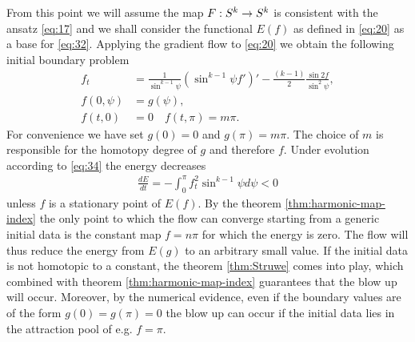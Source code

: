 From this point we will assume the map $F:S^k\rightarrow S^k$ is consistent
with the ansatz \eqref{eq:17} and we shall consider the functional
$E(f)$ as defined in \eqref{eq:20} as a base for
\eqref{eq:32}. Applying the gradient flow to \eqref{eq:20} we obtain
the following initial boundary problem
\begin{equation}
  \label{eq:en_flow}
  \begin{split}
    f_t&=\frac{1}{\sin^{k-1}\psi}\left(\sin^{k-1}\psi
      f'\right)'-\frac{(k-1)}{2}\frac{\sin2f}{\sin^2\psi},\\
    f(0,\psi)&=g(\psi),\\
    f(t,0)&=0\quad f(t,\pi)=m\pi.
  \end{split}
\end{equation}
For convenience we have set $g(0)=0$ and $g(\pi)=m\pi$. The choice of
$m$ is responsible for the homotopy degree of $g$ and therefore
$f$. Under evolution according to \eqref{eq:34} the energy decreases
\begin{align}
  \label{eq:35}
  \frac{dE}{dt}=-\int_0^{\pi}f_t^2\sin^{k-1}\psi d\psi<0
\end{align}
unless $f$ is a stationary point of $E(f)$. By the theorem
\ref{thm:harmonic-map-index} the only point to which the flow can
converge starting from a generic initial data is the constant map
$f=n\pi$ for which the energy is zero. The flow will thus reduce the
energy from $E(g)$ to an arbitrary small value. If the initial data is
not homotopic to a constant, the theorem \ref{thm:Struwe} comes into
play, which combined with theorem \ref{thm:harmonic-map-index}
guarantees that the blow up will occur. Moreover, by the numerical
evidence, even if the boundary values are of the form $g(0)=g(\pi)=0$
the blow up can occur
if the initial data lies in the attraction pool of e.g. $f=\pi$.\\

